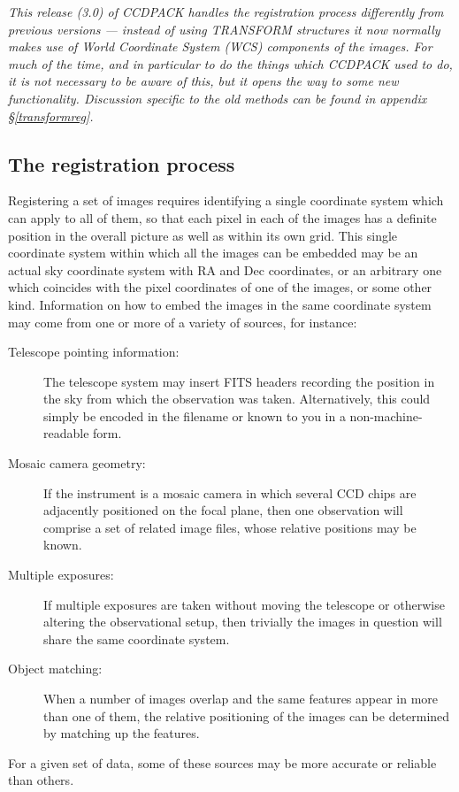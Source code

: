 \documentclass[twoside,11pt]{article}
\newcommand{\xlabel}[1]{}
\renewcommand{\_}{\texttt{\symbol{95}}}
\begin{document}
{\em
This release (3.0) of CCDPACK handles the registration process
differently from previous versions --- instead of using TRANSFORM
structures it now normally makes use of World Coordinate System
(WCS) components of the images.  For much of the time, and in particular
to do the things which CCDPACK used to do, it is not 
necessary to be aware of this, but it opens the way to some new
functionality.
Discussion specific to the old methods can be found in 
appendix \S\ref{transformreg}.
}


\subsection{\xlabel{registrationprocess}\label{regproc}The registration process}

Registering a set of images requires identifying a single 
coordinate system which can apply to all of them, so that 
each pixel in each of the images has a definite position in 
the overall picture as well as within its own grid.
This single coordinate system within which all the images can
be embedded may be an actual sky coordinate system with RA and
Dec coordinates, or an arbitrary one which coincides with the
pixel coordinates of one of the images, or some other kind.
Information on how to embed the images in the same coordinate
system may come from one or more of a variety of sources, 
for instance:
\begin{description}
\item[Telescope pointing information:]
The telescope system may insert FITS headers recording the
position in the sky from which the observation was taken.
Alternatively, this could simply be encoded in the filename or
known to you in a non-machine-readable form.
\item[Mosaic camera geometry:]
If the instrument is a mosaic camera in which several CCD chips
are adjacently positioned on the focal plane,
then one observation will comprise a set of related image files,
whose relative positions may be known.
\item[Multiple exposures:]
If multiple exposures are taken without moving the telescope
or otherwise altering the observational setup,
then trivially the images in question will share the same coordinate
system.
\item[Object matching:]
When a number of images overlap and the same features
appear in more than one of them, the relative positioning
of the images can be determined by matching up the features.
\end{description}
For a given set of data,
some of these sources may be more accurate or reliable than others.
\end{document}
